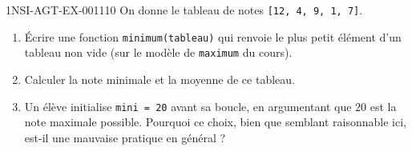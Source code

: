 \begin{exercice}{1NSI-AGT-EX-001}{1}{10}
On donne le tableau de notes \lstinline{[12, 4, 9, 1, 7]}.
\begin{enumerate}
  \item Écrire une fonction \lstinline{minimum(tableau)} qui renvoie le plus petit élément d'un tableau non vide (sur le modèle de \lstinline{maximum} du cours).
  \item Calculer la note minimale et la moyenne de ce tableau.
  \item Un élève initialise \lstinline{mini = 20} avant sa boucle, en argumentant que $20$ est la note maximale possible. Pourquoi ce choix, bien que semblant raisonnable ici, est-il une mauvaise pratique en général ?
\end{enumerate}
\end{exercice}
